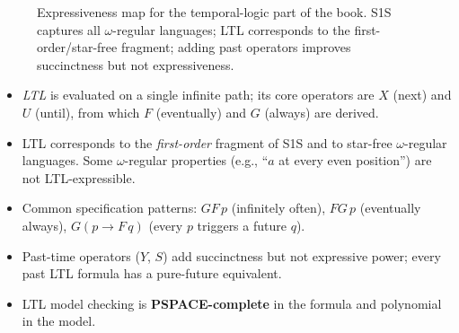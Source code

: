 \begin{figure}[ht]
  \centering
  \caption{Expressiveness map for the temporal-logic part of the book.  S1S
           captures all $\omega$-regular languages; LTL corresponds to the
           first-order/star-free fragment; adding past operators improves
           succinctness but not expressiveness.}
  \label{fig:temporal-logic-expressiveness}
\end{figure}

\begin{summarybox}
\begin{itemize}[nosep]
  \item \emph{LTL} is evaluated on a single infinite path; its core
    operators are $X$ (next) and $U$ (until), from which $F$
    (eventually) and $G$ (always) are derived.
  \item LTL corresponds to the \emph{first-order} fragment of S1S and
    to star-free $\omega$-regular languages.  Some $\omega$-regular
    properties (e.g., ``$a$ at every even position'') are not
    LTL-expressible.
  \item Common specification patterns: $GF\,p$ (infinitely often),
    $FG\,p$ (eventually always), $G(p \to F\,q)$ (every $p$
    triggers a future $q$).
  \item Past-time operators ($Y$, $S$) add succinctness but not
    expressive power; every past LTL formula has a pure-future
    equivalent.
  \item LTL model checking is \textbf{PSPACE-complete} in the formula
    and polynomial in the model.
\end{itemize}
\end{summarybox}

